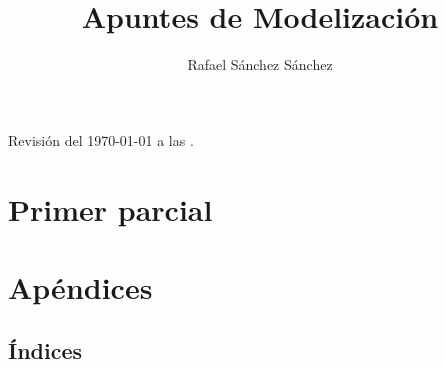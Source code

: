 \documentclass{book}
\title{Apuntes de Modelizaci\'on}
\author{Rafael S\'{a}nchez S\'{a}nchez}
\newcommand{\0}{\mathbf{0}}
\newcommand{\1}{\mathbf{1}}
\begin{document}
\begin{titlepage}
	
\end{titlepage}


Revisión del \today $ $ a las \currenttime.

\begin{center}

\end{center}

\tableofcontents
\part{Primer parcial}

% 
% 
% 
% 
\part{Apéndices}


%


%

\chapter{\'{I}ndices}

\renewcommand{\listtheoremname}{Lista de definiciones}
\listoftheorems[ignore={thm,eg,pro,cor,obs,lm,ex,th_ex}]

\renewcommand{\listtheoremname}{Lista de teoremas}
\listoftheorems[onlynamed,ignore={dfn,eg,cor,obs,ex,th_ex}]

\renewcommand{\listtheoremname}{Lista de ejemplos}
\listoftheorems[onlynamed,ignore={dfn,thm,pro,cor,obs,lm,ex,th_ex}]

\renewcommand{\listtheoremname}{Lista de ejercicios}
\listoftheorems[ignore={dfn,thm,pro,cor,obs,lm,eg}]

\printglossaries


\end{document}
